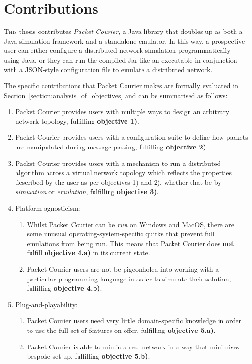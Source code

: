 \section{Contributions}\label{section:contributions}

\lettrine{T}{his} thesis contributes \emph{Packet Courier}, a Java library that doubles up as both a Java simulation
framework and a standalone emulator. In this way, a prospective user can either configure a distributed network
simulation programmatically using Java, or they can run the compiled Jar like an executable in conjunction with a
JSON-style configuration file to emulate a distributed network.

The specific contributions that Packet Courier makes are formally evaluated in
Section~\ref{section:analysis_of_objectives} and can be summarised as follows:
\begin{enumerate}
    \item Packet Courier provides users with multiple ways to design an arbitrary network topology, fulfilling
    \textbf{objective 1)}.
    \item Packet Courier provides users with a configuration suite to define how packets are manipulated during
    message passing, fulfilling \textbf{objective 2)}.
    \item Packet Courier provides users with a mechanism to run a distributed algorithm across a virtual network
    topology which reflects the properties described by the user as per objectives 1) and 2), whether that be by
    \emph{simulation} or \emph{emulation}, fulfilling \textbf{objective 3)}.
    \item Platform agnosticism:
    \begin{enumerate}
        \item Whilst Packet Courier can be \emph{run} on Windows and MacOS, there are some unusual
        operating-system-specific quirks that prevent full emulations from being run. This means that Packet Courier
        does \textbf{not} fulfill \textbf{objective 4.a)} in its current state.
        \item Packet Courier users are not be pigeonholed into working with a particular programming language in
        order to simulate their solution, fulfilling \textbf{objective 4.b)}.
    \end{enumerate}
    \item Plug-and-playability:
    \begin{enumerate}
        \item Packet Courier users need very little domain-specific knowledge in order to use the full set of
        features on offer, fulfilling \textbf{objective 5.a)}.
        \item Packet Courier is able to mimic a real network in a way that minimises bespoke set up, fulfilling
        \textbf{objective 5.b)}.
    \end{enumerate}
\end{enumerate}
